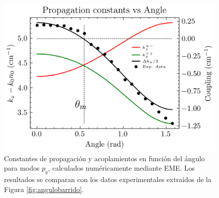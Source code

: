 \begin{figure}[H]
    \centering
    \includegraphics[width=0.6\linewidth]{codigo/eigenvalues_vs_angle.png}
    \caption[Constantes de propagación y acoplamientos angulares para modos P]{Constantes de propagación y acoplamientos en función del ángulo para modos $p_y$, calculados numéricamente mediante EME. Los resultados se comparan con los datos experimentales extraídos de la Figura \ref{fig:angulobarrido}. \label{fig:invisibility-coup}}
\end{figure} \vspace{-2ex}
